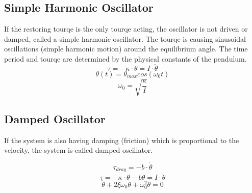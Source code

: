 \documentclass[\main/master.tex]{subfiles}
\begin{document}
\subsection{Simple Harmonic Oscillator}
If the restoring tourqe is the only tourqe acting, the oscillator is not driven or damped, called a simple harmonic oscillator. The tourqe is causing sinusoidal oscillations (simple harmonic motion) around the equilibrium angle. The time period and tourqe are determined by the physical constants of the pendulum. 
\begin{equation}
\tau = -\kappa\cdot\theta  = I\cdot\ddot{\theta}   \label{eqn:undamped_motion_equation}
\end{equation}
\begin{equation}
\theta(t) = \theta_{max}cos(\omega_0 t )    \label{eqn:undamped_motion_equation}
\end{equation}
\begin{equation}
\omega_0  =  \sqrt{\frac{\kappa}{I}}   \label{eqn:undamped_motion_equation}
\end{equation}

\subsection{Damped Oscillator}
If the system is also having damping (friction) which is proportional to the velocity, the system is called damped oscillator.


\begin{equation}
\tau_{drag} = -b\cdot\dot{\theta}   \label{eqn:friction_tourqe}
\end{equation} 
\begin{equation}
\tau = -\kappa\cdot\theta - b\dot{\theta}  = I\cdot\ddot{\theta}   \label{eqn:damped_motion_equation}
\end{equation} 
\begin{equation}
\ddot{\theta} + 2\xi\omega_0\dot{\theta} + \omega_0^2\theta = 0   \label{eqn:damped_motion_equation}
\end{equation}
\end{document}
